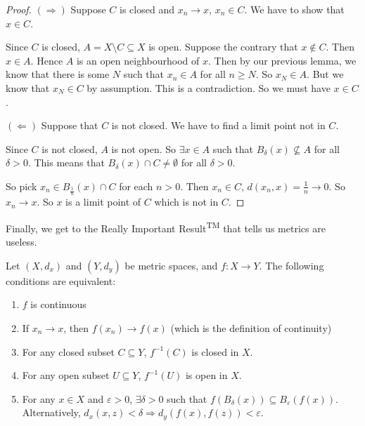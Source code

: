 \documentclass[a4paper]{article}
\begin{document}
\begin{proof}
  $(\Rightarrow)$ Suppose $C$ is closed and $x_n \to x$, $x_n \in C$. We have to show that $x\in C$.

  Since $C$ is closed, $A = X\setminus C\subseteq X$ is open. Suppose the contrary that $x\not\in C$. Then $x\in A$. Hence $A$ is an open neighbourhood of $x$. Then by our previous lemma, we know that there is some $N$ such that $x_n \in A$ for all $n \geq N$. So $x_N \in A$. But we know that $x_N \in C$ by assumption. This is a contradiction. So we must have $x\in C$.

  $(\Leftarrow)$ Suppose that $C$ is not closed. We have to find a limit point not in $C$.

  Since $C$ is not closed, $A$ is not open. So $\exists x\in A$ such that $B_\delta(x)\not\subseteq A$ for all $\delta > 0$. This means that $B_\delta(x) \cap C \not= \emptyset$ for all $\delta > 0$.

  So pick $x_n \in B_{\frac{1}{n}}(x)\cap C$ for each $n > 0$. Then $x_n \in C$, $d(x_n, x) = \frac{1}{n} \to 0$. So $x_n \to x$. So $x$ is a limit point of $C$ which is not in $C$.
\end{proof}

Finally, we get to the Really Important Result\textsuperscript{TM} that tells us metrics are useless.
\begin{prop}
  Let $(X, d_x)$ and $(Y, d_y)$ be metric spaces, and $f: X\to Y$. The following conditions are equivalent:
  \begin{enumerate}
    \item $f$ is continuous
    \item If $x_n \to x$, then $f(x_n) \to f(x)$ (which is the definition of continuity)
    \item For any closed subset $C\subseteq Y$, $f^{-1}(C)$ is closed in $X$.
    \item For any open subset $U\subseteq Y$, $f^{-1}(U)$ is open in $X$.
    \item For any $x\in X$ and $\varepsilon > 0$, $\exists \delta > 0$ such that $f(B_\delta(x)) \subseteq B_\varepsilon(f(x))$. Alternatively, $d_x(x, z) < \delta \Rightarrow d_y(f(x), f(z)) < \varepsilon$.
  \end{enumerate}
\end{prop}
\end{document}
